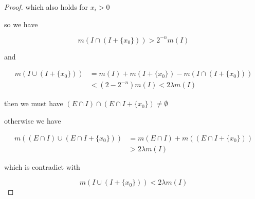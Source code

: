 \documentclass[11pt,a4paper]{article}
\begin{document}
\begin{proof}
    which also holds for $x_i > 0$

    so we have

    \[
        m(I \cap \left( I + \{ x_0 \} \right)) > 2^{-n} m(I)
    \]

    and 

    \begin{align*}
        m(I \cup \left( I + \{ x_0 \} \right)) &= m(I) + m(I + \{ x_0 \}) - m(I \cap \left( I + \{ x_0 \} \right) ) \\
        & < (2 - 2^{-n}) m(I) < 2\lambda m(I)
    \end{align*}

    then we must have $\left( E \cap I \right) \cap \left( E \cap I + \{ x_0 \} \right) \ne \emptyset$ 
    
    otherwise we have

    \begin{align*}
    m(\left( E \cap I \right) \cup \left( E \cap I + \{ x_0 \} \right)) &= m(E \cap I) + m(\left( E \cap I + \{ x_0 \} \right)) \\
    & > 2\lambda m(I)
    \end{align*}

    which is contradict with 

    \[
m(I \cup \left( I + \{ x_0 \} \right)) < 2 \lambda m(I)
    \]

\end{proof}
\end{document}
